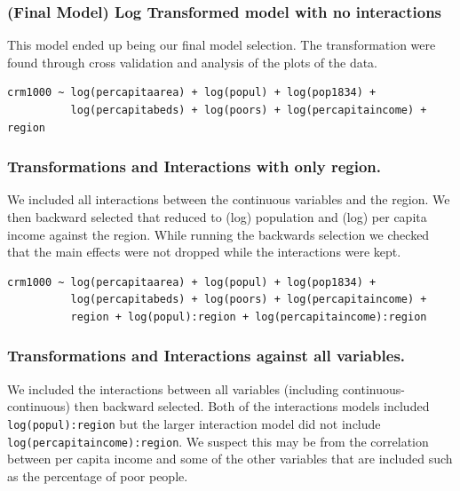 \documentclass[]{article}
\begin{document}
\subsubsection{(Final Model) Log Transformed model with no
interactions}\label{final-model-log-transformed-model-with-no-interactions}

This model ended up being our final model selection. The transformation
were found through cross validation and analysis of the plots of the
data.

\begin{verbatim}
crm1000 ~ log(percapitaarea) + log(popul) + log(pop1834) +
          log(percapitabeds) + log(poors) + log(percapitaincome) + region
\end{verbatim}

\subsubsection{Transformations and Interactions with only
region.}\label{transformations-and-interactions-with-only-region.}

We included all interactions between the continuous variables and the
region. We then backward selected that reduced to (log) population and
(log) per capita income against the region. While running the backwards
selection we checked that the main effects were not dropped while the
interactions were kept.

\begin{verbatim}
crm1000 ~ log(percapitaarea) + log(popul) + log(pop1834) +
          log(percapitabeds) + log(poors) + log(percapitaincome) +
          region + log(popul):region + log(percapitaincome):region
\end{verbatim}

\subsubsection{Transformations and Interactions against all
variables.}\label{transformations-and-interactions-against-all-variables.}

We included the interactions between all variables (including
continuous-continuous) then backward selected. Both of the interactions
models included \texttt{log(popul):region} but the larger interaction
model did not include \texttt{log(percapitaincome):region}. We suspect
this may be from the correlation between per capita income and some of
the other variables that are included such as the percentage of poor
people.
\end{document}
